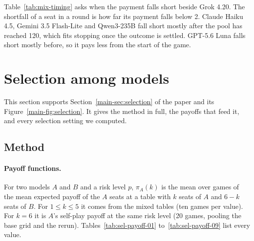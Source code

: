 \documentclass[10pt]{article}
\let\plainsubsection\subsection
\renewcommand{\subsection}{\FloatBarrier\needspace{8\baselineskip}\plainsubsection}
\let\plainsection\section
\renewcommand{\section}{\FloatBarrier\needspace{12\baselineskip}\plainsection}  %
\begin{document}
Table~\ref{tab:mix-timing} asks when the payment falls short beside Grok 4.20. The shortfall of a seat in a round is how far its payment falls below 2. Claude Haiku 4.5, Gemini 3.5 Flash-Lite and Qwen3-235B fall short mostly after the pool has reached 120, which fits stopping once the outcome is settled. GPT-5.6 Luna falls short mostly before, so it pays less from the start of the game.

\begin{table}[h]
\caption{Shortfall below 2 per seat and round beside one to five Grok 4.20 seats (150 games per model, pooled over seat splits and risk levels), before and after the round in which the pool reaches 120. \emph{Per round}: mean over games of the mean shortfall per seat and round; \emph{Games}: games with at least one round in that phase. Right: units short per seat per game before and after, and the share that comes after.}
\label{tab:mix-timing}
\centering\small

\end{table}

\section{Selection among models}
\label{sec:selection}

This section supports Section~\ref{main-sec:selection} of the paper and its Figure~\ref{main-fig:selection}. It gives the method in full, the payoffs that feed it, and every selection setting we computed.

\subsection{Method}

\paragraph{Payoff functions.} For two models $A$ and $B$ and a risk level $p$, $\pi_A(k)$ is the mean over games of the mean expected payoff of the $A$ seats at a table with $k$ seats of $A$ and $6-k$ seats of $B$. For $1\le k\le5$ it comes from the mixed tables (ten games per value). For $k=6$ it is $A$'s self-play payoff at the same risk level (20 games, pooling the base grid and the rerun). Tables~\ref{tab:sel-payoff-01} to~\ref{tab:sel-payoff-09} list every value.
\end{document}
